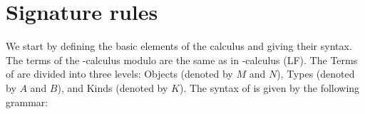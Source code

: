 
\section{Signature rules}

We start by defining the basic elements of the \lpm{} calculus and giving their syntax.
The terms of the \lp-calculus modulo are the same as in \lp-calculus (LF).
The Terms of \lpm{} are divided into three levels: Objects (denoted by $M$ and $N$), Types (denoted by $A$ and $B$), and Kinds (denoted by $K$).
The syntax of \lpm{} is given by the following grammar:



